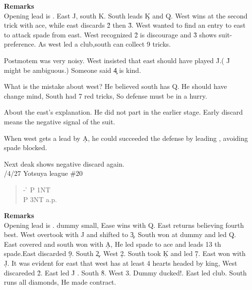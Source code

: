 {\bf Remarks}\\

Opening lead is . East \s J, south \s K. South leads \d K and \d Q.
West wins at the second trick with ace, while east discards \h 2 then \h 3.
West wanted to find an entry to east to attack spade from east.
West recognized \h 2 is discourage and \h 3 shows suit-preference.
As west led a club,south can collect 9 tricks.

Postmotem was very noisy. West insisted that east should have
played \h J.( \h J might be ambiguous.) Someone said \c 4 is kind.

What is the mistake about west? He believed south has \s Q.
He should have change mind, South had 7 red tricks, So defense
must be in a hurry.

About the east's explanation. He did not part  in the
earlier stage. Early discard means the negative signal of the suit.

When west gets a lead by \d A, he could succeeded the defense by leading 
, avoiding spade blocked.
\vspace{0.5cm}

Next deak shows negative discard again.\\
/4/27 Yotsuya league \#20
\begin{quote}
%
  {}%
  {}
  {}%
  {}%
\end{quote}
\begin{quote}
\begin{bidding}
- \h   \> P  \> 1NT\\
P \> 3NT \> a.p.
\end{bidding}
\end{quote}

{\bf Remarks}\\

Opening lead is . dummy small, Ease wins with \s Q.
East returns  believing fourth best. West overtook with
\s J and shifted to \c 3. South won at dummy and led \d Q.
East covered and south won with \d A, He led spade to ace and 
leads 13 th spade.East discarded \d 9. South \c 2. West \d 2.
South took \c K and led \d 7. East won with \d J. It was 
evident for east that west has at least 4 hearts headed by king,
West discareded \h 2. East led \h J . South \h 8. West 3. Dummy
ducked!. East led club. South runs all diamonds, He made contract.


